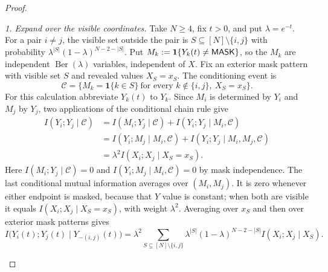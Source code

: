 \begin{proof}
\begin{samepage}
\emph{1. Expand over the visible coordinates.}
Take $N\ge4$, fix $t>0$, and put $\lambda=e^{-t}$.
For a pair $i\ne j$, the visible set outside the pair is
$S\subseteq[N]\setminus\{i,j\}$ with probability
$\lambda^{|S|}(1-\lambda)^{N-2-|S|}$.
Put $M_k:=\mathbf 1\{Y_k(t)\ne\mathsf{MASK}\}$, so the $M_k$ are independent
$\operatorname{Ber}(\lambda)$ variables, independent of $X$.
Fix an exterior mask pattern with visible set $S$ and revealed values
$X_S=x_S$.  The conditioning event is
\[
 \mathcal C=\{M_k=\mathbf 1\{k\in S\}\ \text{for every }k\notin\{i,j\},
                \ X_S=x_S\}.
\]
For this calculation abbreviate $Y_k(t)$ to $Y_k$.
Since $M_i$ is determined by $Y_i$ and $M_j$ by $Y_j$, two applications
of the conditional chain rule give
\begin{align*}
 I(Y_i;Y_j\mid\mathcal C)
 &=I(M_i;Y_j\mid\mathcal C)
   +I(Y_i;Y_j\mid M_i,\mathcal C)\\
 &=I(Y_i;M_j\mid M_i,\mathcal C)
   +I(Y_i;Y_j\mid M_i,M_j,\mathcal C)\\
 &=\lambda^2 I(X_i;X_j\mid X_S=x_S).
\end{align*}
Here $I(M_i;Y_j\mid\mathcal C)=0$ and
$I(Y_i;M_j\mid M_i,\mathcal C)=0$ by mask independence.
The last conditional mutual information averages over $(M_i,M_j)$.
It is zero whenever either endpoint is masked, because that $Y$ value is
constant; when both are visible it equals
$I(X_i;X_j\mid X_S=x_S)$, with weight $\lambda^2$.
Averaging over $x_S$ and then over exterior mask patterns gives
\begin{equation}
 I\bigl(Y_i(t);Y_j(t)\mid Y_{-(i,j)}(t)\bigr)
 =\lambda^2
   \sum_{S\subseteq[N]\setminus\{i,j\}}
    \lambda^{|S|}(1-\lambda)^{N-2-|S|}
    I(X_i;X_j\mid X_S).
 \label{app:eq:masked-pair-information}
\end{equation}
\end{samepage}


\end{proof}
